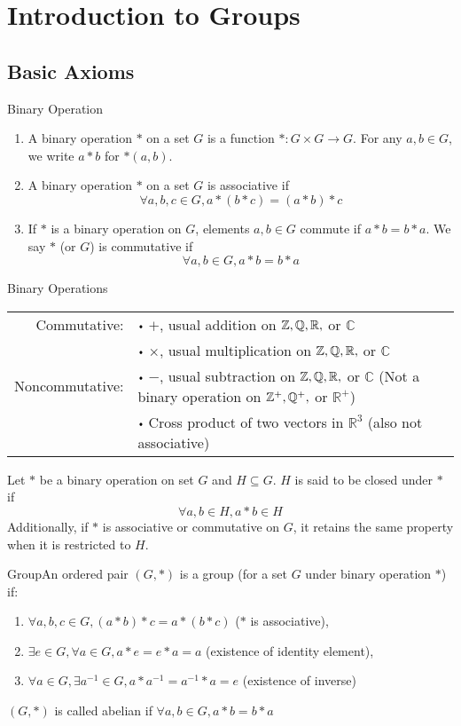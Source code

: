 \documentclass{report}
\newcommand{\ex}[2]{\begin{Example}{#1}{}#2\end{Example}}
\newcommand{\dfn}[2]{\begin{Definition}[colbacktitle=red!75!black]{#1}{}#2\end{Definition}}
\newcommand{\bbC}{\mathbb{C}}	\newcommand{\bbD}{\mathbb{D}}
\newcommand{\bbQ}{\mathbb{Q}}	\newcommand{\bbR}{\mathbb{R}}
\begin{document}
\chapter{Introduction to Groups}
\section{Basic Axioms}
\dfn{Binary Operation}{\begin{enumerate}
\item A binary operation $*$ on a set $G$ is a function $*: G \times G \rightarrow G$. For any $a, b \in G$, we write $a * b$ for $*(a,b)$.
\item A binary operation $*$ on a set $G$ is associative if $$\forall a,b,c \in G, a*(b*c) = (a*b)*c$$
\item If $*$ is a binary operation on $G$, elements $a, b \in G$ commute if $a*b = b*a$. We say $*$ (or $G$) is commutative if $$\forall a,b \in G, a*b = b*a$$
\end{enumerate}}
\ex{Binary Operations}{\begin{tabular}{rl}
		Commutative:   & {$\vcenter{\hbox{\tiny$\bullet$}}$} $+$, usual addition on $\bbZ, \bbQ, \bbR,$ or $\bbC$ \\
		            & {$\vcenter{\hbox{\tiny$\bullet$}}$} $\times$, usual multiplication on $\bbZ, \bbQ, \bbR,$ or $\bbC$ \\
		Noncommutative: & {$\vcenter{\hbox{\tiny$\bullet$}}$} $-$, usual subtraction on $\bbZ, \bbQ, \bbR,$ or $\bbC$ (Not a binary operation on $\bbZ^+, \bbQ^+,$ or $\bbR^+$) \\
		            & {$\vcenter{\hbox{\tiny$\bullet$}}$} Cross product of two vectors in $\bbR^3$ (also not associative)                           \\ 
	\end{tabular}}
Let $*$ be a binary operation on set $G$ and $H \subseteq G$. $H$ is said to be closed under $*$ if
$$\forall a,b \in H, a*b \in H$$
Additionally, if $*$ is associative or commutative on $G$, it retains the same property when it is restricted to $H$. 
\dfn{Group}{An ordered pair $(G, *)$ is a group (for a set $G$ under binary operation $*$) if:
\begin{enumerate}
    \item $\forall a,b,c \in G, (a*b)*c= a*(b*c)$ ($*$ is associative),
    \item $\exists e \in G, \forall a \in G, a*e = e*a = a$ (existence of identity element),
    \item $\forall a \in G, \exists a^{-1} \in G, a*a^{-1} = a^{-1}*a = e$ (existence of inverse)
\end{enumerate}
$(G, *)$ is called abelian if $\forall a, b \in G, a*b = b*a$}
\end{document}

